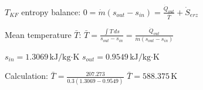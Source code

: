\( T_{KF} \) entropy balance:  
\( 0 = \dot{m} (s_{out} - s_{in}) = \frac{\dot{Q}_{out}}{\bar{T}} + \dot{S}_{erz} \)  

Mean temperature \( \bar{T} \):  
\( \bar{T} = \frac{\int T \, ds}{s_{out} - s_{in}} = \frac{\dot{Q}_{out}}{\dot{m} (s_{out} - s_{in})} \)  

\( s_{in} = 1.3069 \, \text{kJ/kg·K} \)  
\( s_{out} = 0.9549 \, \text{kJ/kg·K} \)  

Calculation:  
\( \bar{T} = \frac{207.273}{0.3 (1.3069 - 0.9549)} \)  
\( \bar{T} = 588.375 \, \text{K} \)
